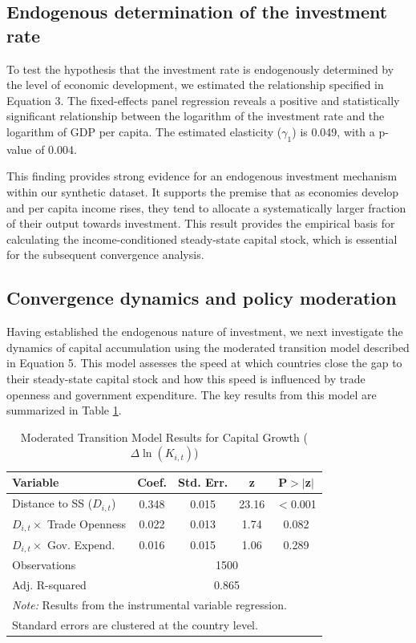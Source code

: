 \documentclass[]{article}
\begin{document}
\subsection{Endogenous determination of the investment rate}
To test the hypothesis that the investment rate is endogenously determined by the level of economic development, we estimated the relationship specified in Equation 3. The fixed-effects panel regression reveals a positive and statistically significant relationship between the logarithm of the investment rate and the logarithm of GDP per capita. The estimated elasticity ($\gamma_1$) is 0.049, with a p-value of 0.004.

This finding provides strong evidence for an endogenous investment mechanism within our synthetic dataset. It supports the premise that as economies develop and per capita income rises, they tend to allocate a systematically larger fraction of their output towards investment. This result provides the empirical basis for calculating the income-conditioned steady-state capital stock, which is essential for the subsequent convergence analysis.

\subsection{Convergence dynamics and policy moderation}
Having established the endogenous nature of investment, we next investigate the dynamics of capital accumulation using the moderated transition model described in Equation 5. This model assesses the speed at which countries close the gap to their steady-state capital stock and how this speed is influenced by trade openness and government expenditure. The key results from this model are summarized in Table \ref{tab:moderation_results}.

\begin{table}[h!]
\centering
\caption{Moderated Transition Model Results for Capital Growth ($\Delta \ln(K_{i,t})$)}
\label{tab:moderation_results}
\begin{tabular}{lcccc}
\hline
\hline
Variable & Coef. & Std. Err. & z & P$>$$|$z$|$ \\
\hline
Distance to SS ($D_{i,t}$) & 0.348 & 0.015 & 23.16 & $<$0.001 \\
$D_{i,t} \times$ Trade Openness & 0.022 & 0.013 & 1.74 & 0.082 \\
$D_{i,t} \times$ Gov. Expend. & 0.016 & 0.015 & 1.06 & 0.289 \\
\hline
Observations & \multicolumn{4}{c}{1500} \\
Adj. R-squared & \multicolumn{4}{c}{0.865} \\
\hline
\multicolumn{5}{l}{\footnotesize \textit{Note:} Results from the instrumental variable regression. }\\
\multicolumn{5}{l}{\footnotesize Standard errors are clustered at the country level.}
\end{tabular}
\end{table}
\end{document}
